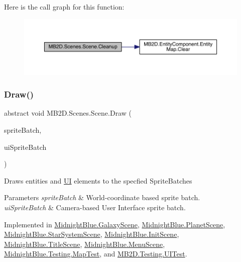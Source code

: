 Here is the call graph for this function\+:\nopagebreak
\begin{figure}[H]
\begin{center}
\leavevmode
\includegraphics[width=350pt]{class_m_b2_d_1_1_scenes_1_1_scene_a3ee3777b94ccff0a739e75ca1ca151c6_cgraph}
\end{center}
\end{figure}
\hypertarget{class_m_b2_d_1_1_scenes_1_1_scene_a932d33071ecb4c5187367825dba72324}{}\label{class_m_b2_d_1_1_scenes_1_1_scene_a932d33071ecb4c5187367825dba72324} 
\subsubsection{\texorpdfstring{Draw()}{Draw()}}
{\footnotesize\ttfamily abstract void M\+B2\+D.\+Scenes.\+Scene.\+Draw (\begin{DoxyParamCaption}\item[{Sprite\+Batch}]{sprite\+Batch,  }\item[{Sprite\+Batch}]{ui\+Sprite\+Batch }\end{DoxyParamCaption})\hspace{0.3cm}{\ttfamily [pure virtual]}}



Draws entities and \hyperlink{namespace_m_b2_d_1_1_u_i}{UI} elements to the specfied Sprite\+Batches 


\begin{DoxyParams}{Parameters}
{\em sprite\+Batch} & World-\/coordinate based sprite batch.\\
\hline
{\em ui\+Sprite\+Batch} & Camera-\/based User Interface sprite batch.\\
\hline
\end{DoxyParams}


Implemented in \hyperlink{class_midnight_blue_1_1_galaxy_scene_a3646fcf97e067bac267d42aad66e71c4}{Midnight\+Blue.\+Galaxy\+Scene}, \hyperlink{class_midnight_blue_1_1_planet_scene_af22a201631e5f8c606ec3f7463635977}{Midnight\+Blue.\+Planet\+Scene}, \hyperlink{class_midnight_blue_1_1_star_system_scene_ac3d90fb8d914d15b912f5da3cc1aa8a0}{Midnight\+Blue.\+Star\+System\+Scene}, \hyperlink{class_midnight_blue_1_1_init_scene_a5d6b21ff45a6c14edcf0bd8318133725}{Midnight\+Blue.\+Init\+Scene}, \hyperlink{class_midnight_blue_1_1_title_scene_a03fa806a36226ec5fd0ce09870109c18}{Midnight\+Blue.\+Title\+Scene}, \hyperlink{class_midnight_blue_1_1_menu_scene_a600112073f48c763a50c802960f5fdaa}{Midnight\+Blue.\+Menu\+Scene}, \hyperlink{class_midnight_blue_1_1_testing_1_1_map_test_a03d0a9349662afafaa301a8581fbf01f}{Midnight\+Blue.\+Testing.\+Map\+Test}, and \hyperlink{class_m_b2_d_1_1_testing_1_1_u_i_test_a9656d2d62517288a7b4387dafe741ea0}{M\+B2\+D.\+Testing.\+U\+I\+Test}.

